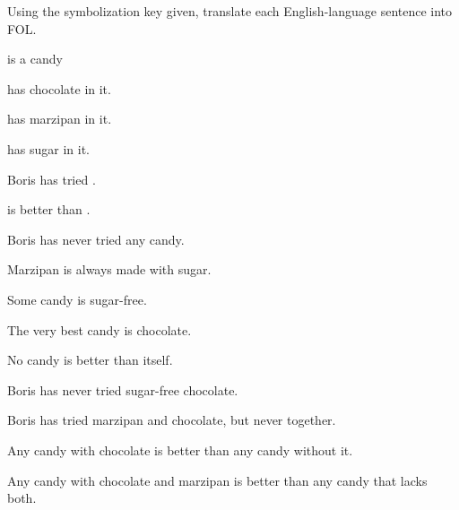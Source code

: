 \begin{practiceproblems}
			\problempart
			\label{pr:QLcandies}
			Using the symbolization key given, translate each English-language sentence into FOL.
			\begin{ekey}
	\item[Cx] is a candy
				\item[\atom{H}{x}]  has chocolate in it.
				\item[\atom{M}{x}]  has marzipan in it.
				\item[\atom{S}{x}]  has sugar in it.
				\item[\atom{T}{x}] Boris has tried .
				\item[\atom{B}{xy}]  is better than .
			\end{ekey}
			\begin{problemslist}
				\item Boris has never tried any candy.
				\item Marzipan is always made with sugar.
				\item Some candy is sugar-free.
				\item The very best candy is chocolate.
				\item No candy is better than itself.
				\item Boris has never tried sugar-free chocolate.
				\item Boris has tried marzipan and chocolate, but never together.
				\item Any candy with chocolate is better than any candy without it.
				\item Any candy with chocolate and marzipan is better than any candy that lacks both.
			\end{problemslist}
			
			
			
\end{practiceproblems}
		
		


	
	
	
	
